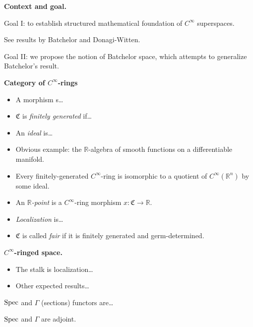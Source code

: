\medskip\noindent
{\bf Context and goal.}

Goal I: to establish structured mathematical
foundation of $C^\infty$ superspaces.

See results by Batchelor and Donagi-Witten.

Goal II: we propose the notion of Batchelor
space, which attempts to generalize
Batchelor's result.

\medskip\noindent
{\bf Category of $C^\infty$-rings}

\begin{definition}
\label{definition-cinf-ring}

\end{definition}

\begin{itemize}
\item A morphism s…
\item $\mathfrak{C}$ is {\it finitely
generated} if…
\item An {\it ideal} is…
\item Obvious example: the
$\mathbb{R}$-algebra of smooth functions on
a differentiable manifold.
\item Every finitely-generated
$C^\infty$-ring is isomorphic to a quotient
of $C^\infty(\mathbb{R}^n)$ by some ideal.
\item An {\it $\mathbb{R}$-point} is a
$C^\infty$-ring morphism $x:\mathfrak{C}\to
\mathbb{R}$.
\item {\it Localization} is…
\item $\mathfrak{C}$ is called {\it fair} if
it is finitely generated and
germ-determined.
\end{itemize}

\medskip\noindent
{\bf $C^\infty$-ringed space.}

\begin{definition}
\label{definition-cinf-ringed-space}

\end{definition}

\begin{itemize}
\item The stalk is localization…
\item Other expected results…
\end{itemize}

\noindent $\mathop{\mathrm{Spec}}$ and $\Gamma$ (sections)
functors are…

\begin{theorem}[Joyce]
\label{theorem-joyce-adjoint-functors}
$\mathop{\mathrm{Spec}}$ and $\Gamma$ are adjoint.
\end{theorem}


